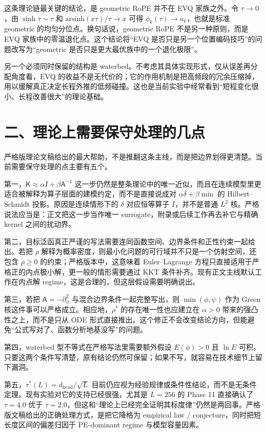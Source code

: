 \documentclass[11pt]{article}
\begin{document}
这条理论链最关键的结论，是 geometric RoPE 并不在 EVQ 家族之外。令 \(\tau\to 0\)，由 \(\sinh\tau\sim\tau\) 和 \(\mathrm{arsinh}(x\tau)/\tau\to x\) 可得 \(\phi_k(\tau)\to u_k\)，也就是标准 geometric 的均匀分位点。换句话说，geometric RoPE 不是另一种原则，而是 EVQ 家族中的零温退化点。这个结论将“EVQ 是否只是另一个位置编码技巧”的问题改写为“geometric 是否只是更大最优族中的一个退化极限”。

另一个必须同时保留的结构是 waterbed。不考虑其具体实现形式，仅从误差再分配角度看，EVQ 的收益不是无代价的；它的作用机制是把高频段的冗余压缩掉，用以缓解真正决定长程外推的低频碰撞。这也是当前实验中经常看到“短程变化很小、长程改善很大”的理论基础。

\section*{二、理论上需要保守处理的几点}

严格版理论文稿给出的最大帮助，不是推翻这条主线，而是把边界划得更清楚。当前需要保守处理的点主要有五个。

第一，\(\mathsf K\approx \alpha I+\beta \mathsf A^{-1}\) 这一步仍然是整条理论中的唯一近似，而且在连续模型里更适合被解释为算子层面的建模约定，而不是直接说成对 \(\alpha\delta+\beta\min\) 的 Hilbert--Schmidt 投影。原因是连续情形下的 \(\delta\) 对应恒等算子 \(I\)，并不是普通 \(L^2\) 核。严格说法应当是：正文把这一步当作唯一 surrogate，附录或后续工作再去补它与精确 kernel 之间的扰动界。

第二，目标泛函真正严谨的写法需要连同函数空间、边界条件和正性约束一起给出。若把 \(\rho\) 解释为概率密度，则最小化问题的可行域并不只是一个仿射空间，还包含 \(\rho\ge 0\) 的约束；严格版本中，这意味着 Euler--Lagrange 方程只直接适用于严格正的内点极小解，更一般的情形需要通过 KKT 条件补齐。现有正文主线默认工作在内点解 regime，这是合理的，但这层假设需要明确说出。

第三，若把 \(\mathsf A=-\partial_\phi^2\) 与混合边界条件一起完整写出，则 \(\min(\phi,\psi)\) 作为 Green 核这件事可以严格成立。相应地，\(\rho^*\) 的存在唯一性也应建立在 \(\alpha>0\) 带来的强凸性之上，而不是只从 ODE 形式直接推出。这个修正不会改变结论方向，但能避免“公式写对了、函数分析地基没写”的问题。

第四，waterbed 型不等式在严格写法里需要额外假设 \(E(\phi)>0\) 且 \(\ln E\) 可积。只要这两个条件写清楚，原有结论仍然可保留；如果不写，就容易在技术细节上留下漏洞。

第五，\(\tau^*(L)=d_{\mathrm{head}}/\sqrt L\) 目前仍应视为经验规律或条件性结论，而不是无条件定理。现有实验对它的支持已经很强，尤其是 \(L=256\) 的 Phase 11 直接确认了 \(\tau=4.0\) 优于 \(\tau=2.0\)，但这和“理论上已经完全证明其标度律”仍然是两回事。严格版文稿给出的正确处理方式，是把它降格为 empirical law / conjecture，同时把短长度区间的偏差归因于 PE-dominant regime 与模型容量因素。
\end{document}
